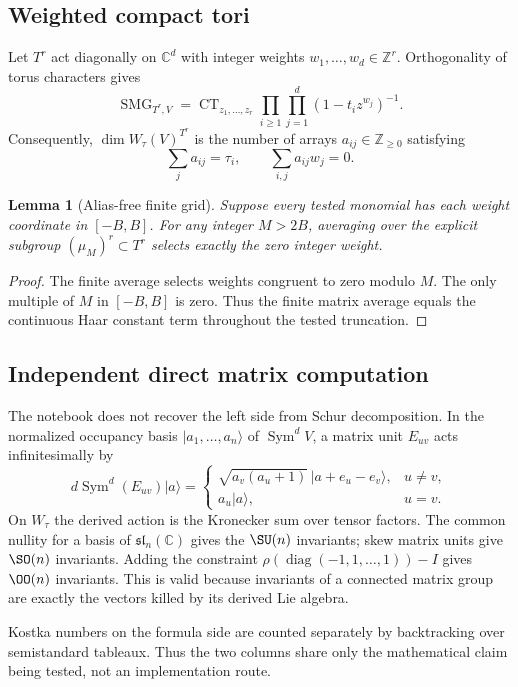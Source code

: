 \documentclass[10pt]{article}
\newcommand{\Sym}{\operatorname{Sym}}
\newcommand{\CT}{\operatorname{CT}}
\newcommand{\SMG}{\operatorname{SMG}}
\newcommand{\MGF}{\SMG}
\newtheorem{lemma}{Lemma}
\begin{document}
\subsection{Weighted compact tori}
Let $T^r$ act diagonally on $\mathbb C^d$ with integer weights
$w_1,\ldots,w_d\in\mathbb Z^r$.  Orthogonality of torus characters gives
\[
 \boxed{\MGF_{T^r,V}
 =\CT_{z_1,\ldots,z_r}
 \prod_{i\ge1}\prod_{j=1}^d(1-t_i z^{w_j})^{-1}.}
\]
Consequently, $\dim W_\tau(V)^{T^r}$ is the number of arrays
$a_{ij}\in\mathbb Z_{\ge0}$ satisfying
\[
 \sum_j a_{ij}=\tau_i,
 \qquad
 \sum_{i,j}a_{ij}w_j=0.
\]

\begin{lemma}[Alias-free finite grid]
Suppose every tested monomial has each weight coordinate in $[-B,B]$.
For any integer $M>2B$, averaging over the explicit subgroup
$(\mu_M)^r\subset T^r$ selects exactly the zero integer weight.
\end{lemma}
\begin{proof}
The finite average selects weights congruent to zero modulo $M$.  The only
multiple of $M$ in $[-B,B]$ is zero.  Thus the finite matrix average equals the
continuous Haar constant term throughout the tested truncation.
\end{proof}

\subsection{Independent direct matrix computation}
The notebook does not recover the left side from Schur decomposition.  In the
normalized occupancy basis $|a_1,\ldots,a_n\rangle$ of $\Sym^dV$, a matrix unit
$E_{uv}$ acts infinitesimally by
\[
 d\Sym^d(E_{uv})|a\rangle=
 \begin{cases}
 \sqrt{a_v(a_u+1)}\,|a+e_u-e_v\rangle,&u\ne v,\\
 a_u|a\rangle,&u=v.
 \end{cases}
\]
On $W_\tau$ the derived action is the Kronecker sum over tensor factors.
The common nullity for a basis of $\mathfrak{sl}_n(\mathbb C)$ gives the
$\SU(n)$ invariants; skew matrix units give $\SO(n)$ invariants.  Adding the
constraint $\rho(\operatorname{diag}(-1,1,\ldots,1))-I$ gives $\OO(n)$
invariants.  This is valid because invariants of a connected matrix group are
exactly the vectors killed by its derived Lie algebra.

Kostka numbers on the formula side are counted separately by backtracking over
semistandard tableaux.  Thus the two columns share only the mathematical claim
being tested, not an implementation route.
\end{document}
